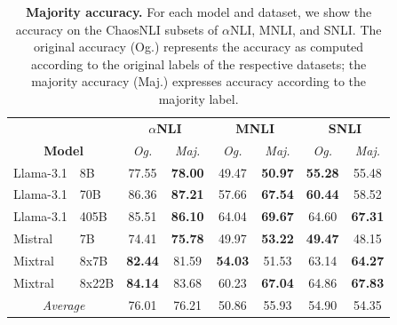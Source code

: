 \begin{table}
    \centering
    \begin{tabular}{llcccccc}
        & & \multicolumn{2}{c}{\textbf{$\alpha$NLI}} & \multicolumn{2}{c}{\textbf{MNLI}} & \multicolumn{2}{c}{\textbf{SNLI}} \\
        \multicolumn{2}{c}{\textbf{Model}} & \textit{Og.} & \textit{Maj.} & \textit{Og.} & \textit{Maj.} & \textit{Og.} & \textit{Maj.}\\
        \toprule
        Llama-3.1 & 8B & 77.55 & \textbf{78.00} & 49.47 & \textbf{50.97} & \textbf{55.28} & 55.48 \\
        Llama-3.1 & 70B & 86.36 & \textbf{87.21} & 57.66 & \textbf{67.54} & \textbf{60.44} & 58.52 \\
        Llama-3.1 & 405B & 85.51 & \textbf{86.10} & 64.04 & \textbf{69.67} & 64.60 & \textbf{67.31} \\
        \midrule
        Mistral & 7B & 74.41 & \textbf{75.78} & 49.97 & \textbf{53.22} & \textbf{49.47} & 48.15 \\
        Mixtral & 8x7B & \textbf{82.44} & 81.59 & \textbf{54.03} & 51.53 & 63.14 & \textbf{64.27} \\
        Mixtral & 8x22B & \textbf{84.14} & 83.68 & 60.23 & \textbf{67.04} & 64.86 & \textbf{67.83} \\
        \midrule
        \multicolumn{2}{c}{\emph{Average}} & 76.01 & 76.21 & 50.86 & 55.93 & 54.90 & 54.35 \\
    \end{tabular}
    \caption{\textbf{Majority accuracy.} For each model and dataset, we show the accuracy on the ChaosNLI subsets of $\alpha$NLI, MNLI, and SNLI. The original accuracy (Og.) represents the accuracy as computed according to the original labels of the respective datasets; the majority accuracy (Maj.) expresses accuracy according to the majority label.}
\label{tab:chaos_acc}
\end{table}

